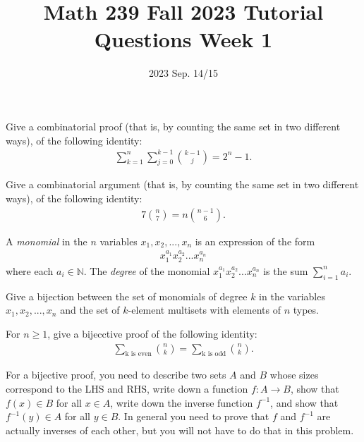 \title{Math 239 Fall 2023 Tutorial Questions Week 1}

\date{2023 Sep. 14/15}
\maketitle

\begin{enumerate}
     Give a combinatorial proof (that is, by counting the same set in two different ways), of the following identity:
    \begin{align*}
        \sum^n_{k=1}\sum^{k-1}_{j=0}{{k-1}\choose j} =2^n-1.
    \end{align*}
    
     Give a combinatorial argument (that is, by counting the same set in two different ways), of the following identity: 
    \begin{align*}
        7{n \choose 7}=n{n-1\choose 6}.
    \end{align*}

    
     A \emph{monomial} in the $n$ variables $x_1,x_2,...,x_n$ is an expression of the form 
    \begin{align*}
        x_1^{a_1}x_2^{a_2}...x_n^{a_n}
    \end{align*}
    where each $a_i\in\mathbb{N}$. The \emph{degree} of the monomial $x_1^{a_1}x_2^{a_2}...x_n^{a_n}$ is the sum $\sum^n_{i=1}a_i$.

    Give a bijection between the set of monomials of degree $k$ in the variables $x_1,x_2,...,x_n$ and the set of $k$-element multisets with elements of $n$ types. 
    
     For $n\geq 1$, give a bijecctive proof of the following identity:
    \begin{align*}
        \sum_{\text{k is even}} {n \choose k}=\sum_{\text{k is odd}}{n \choose k}.
    \end{align*}

    For a bijective proof, you need to describe two sets $A$ and $B$ whose sizes correspond to the LHS and RHS, write down a function $f: A\rightarrow B$, show that $f(x)\in B$ for all $x\in A$, write down the inverse function $f^{-1}$, and show that $f^{-1}(y)\in A$ for all $y\in B$. In general you need to prove that $f$ and $f^{-1}$ are actually inverses of each other, but you will not have to do that in this problem. 
    
\end{enumerate}